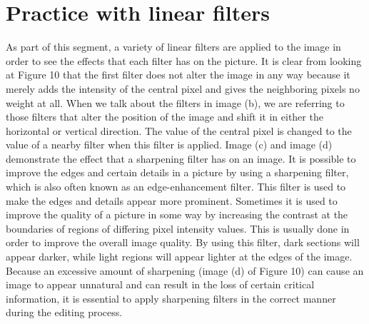 \section{Practice with linear filters }\label{P3}

As part of this segment, a variety of linear filters are applied to the image in order to see the effects that each filter has on the picture. It is clear from looking at Figure 10 that the first filter does not alter the image in any way because it merely adds the intensity of the central pixel and gives the neighboring pixels no weight at all. When we talk about the filters in image (b), we are referring to those filters that alter the position of the image and shift it in either the horizontal or vertical direction. The value of the central pixel is changed to the value of a nearby filter when this filter is applied. Image (c) and image (d) demonstrate the effect that a sharpening filter has on an image. It is possible to improve the edges and certain details in a picture by using a sharpening filter, which is also often known as an edge-enhancement filter. This filter is used to make the edges and details appear more prominent. Sometimes it is used to improve the quality of a picture in some way by increasing the contrast at the boundaries of regions of differing pixel intensity values. This is usually done in order to improve the overall image quality. By using this filter, dark sections will appear darker, while light regions will appear lighter at the edges of the image. Because an excessive amount of sharpening (image (d) of Figure 10) can cause an image to appear unnatural and can result in the loss of certain critical information, it is essential to apply sharpening filters in the correct manner during the editing process.

\newpage

